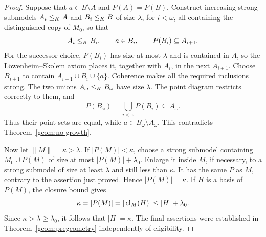 \begin{proof}
Suppose that $a\in B\setminus A$ and $P(A)=P(B)$.  Construct
increasing strong submodels $A_i\leq_K A$ and $B_i\leq_K B$ of
size $\lambda$, for $i<\omega$, all containing the distinguished
copy of $M_0$, so that
\[
A_i\leq_K B_i,\qquad a\in B_i,\qquad
P(B_i)\subseteq A_{i+1}.
\]
For the successor choice, $P(B_i)$ has size at most $\lambda$ and
is contained in $A$, so the L\"owenheim--Skolem axiom places it,
together with $A_i$, in the next $A_{i+1}$.  Choose $B_{i+1}$ to
contain $A_{i+1}\cup B_i\cup\{a\}$.  Coherence makes all the
required inclusions strong.  The two unions $A_\omega\leq_K
B_\omega$ have size $\lambda$.  The point diagram restricts
correctly to them, and
\[
P(B_\omega)=\bigcup_{i<\omega}P(B_i)
             \subseteq A_\omega.
\]
Thus their point sets are equal, while $a\in B_\omega\setminus
A_\omega$.  This contradicts Theorem~\ref{geom:no-growth}.

Now let $\|M\|=\kappa>\lambda$.  If $|P(M)|<\kappa$, choose a
strong submodel containing $M_0\cup P(M)$ of size at most
$|P(M)|+\lambda_0$.  Enlarge it inside $M$, if necessary, to a
strong submodel of size at least $\lambda$ and still less than
$\kappa$.  It has the same $P$ as $M$, contrary to the assertion
just proved.  Hence $|P(M)|=\kappa$.  If $H$ is a basis of $P(M)$,
the closure bound gives
\[
\kappa=|P(M)|=|\operatorname{cl}_M(H)|\leq |H|+\lambda_0.
\]
Since $\kappa>\lambda\geq\lambda_0$, it follows that
$|H|=\kappa$.  The final assertions were established in
Theorem~\ref{geom:pregeometry} independently of eligibility.
\end{proof}
